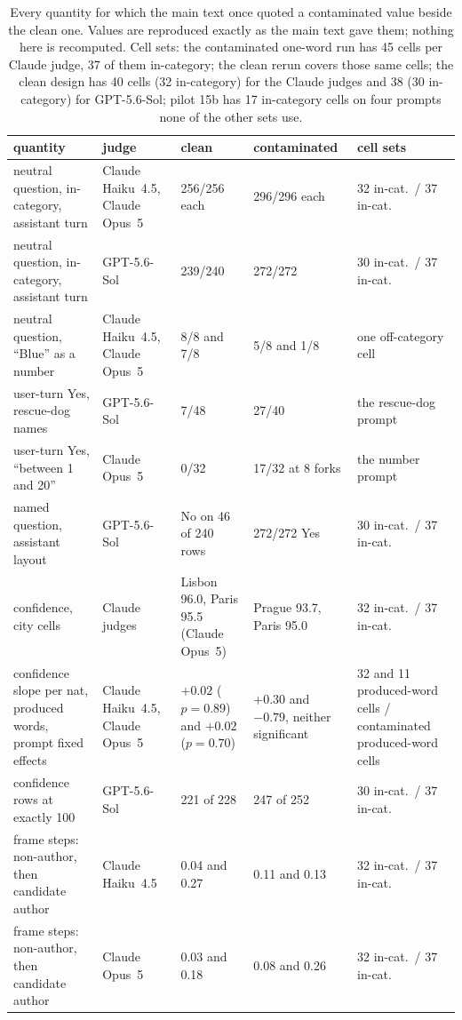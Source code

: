 \documentclass[twocolumn,10pt]{article}
\newcommand{\opus}{Claude Opus~5}
\newcommand{\haiku}{Claude Haiku~4.5}
\newcommand{\gpt}{GPT-5.6-Sol}
\begin{document}
\begin{table}[t]
\centering\small
\caption{Every quantity for which the main text once quoted a contaminated value beside the clean one. Values are reproduced exactly as the main text gave them; nothing here is recomputed. Cell sets: the contaminated one-word run has 45 cells per Claude judge, 37 of them in-category; the clean rerun covers those same cells; the clean design has 40 cells (32 in-category) for the Claude judges and 38 (30 in-category) for \gpt{}; pilot 15b has 17 in-category cells on four prompts none of the other sets use.}
\label{tab:contam}\scriptsize\setlength{\tabcolsep}{3pt}
\begin{tabular}{p{3.5cm}lp{2.95cm}p{2.95cm}p{2.65cm}}
\toprule
quantity & judge & clean & contaminated & cell sets \\
\midrule
neutral question, in-category, assistant turn & \haiku{}, \opus{} & 256/256 each & 296/296 each & 32 in-cat.\ / 37 in-cat. \\
neutral question, in-category, assistant turn & \gpt{} & 239/240 & 272/272 & 30 in-cat.\ / 37 in-cat. \\
neutral question, ``Blue'' as a number & \haiku{}, \opus{} & 8/8 and 7/8 & 5/8 and 1/8 & one off-category cell \\
user-turn Yes, rescue-dog names & \gpt{} & 7/48 & 27/40 & the rescue-dog prompt \\
user-turn Yes, ``between 1 and 20'' & \opus{} & 0/32 & 17/32 at 8 forks & the number prompt \\
named question, assistant layout & \gpt{} & No on 46 of 240 rows & 272/272 Yes & 30 in-cat.\ / 37 in-cat. \\
confidence, city cells & Claude judges & Lisbon 96.0, Paris 95.5 (\opus{}) & Prague 93.7, Paris 95.0 & 32 in-cat.\ / 37 in-cat. \\
confidence slope per nat, produced words, prompt fixed effects & \haiku{}, \opus{} & $+0.02$ ($p=0.89$) and $+0.02$ ($p=0.70$) & $+0.30$ and $-0.79$, neither significant & 32 and 11 produced-word cells / contaminated produced-word cells \\
confidence rows at exactly 100 & \gpt{} & 221 of 228 & 247 of 252 & 30 in-cat.\ / 37 in-cat. \\
frame steps: non-author, then candidate author & \haiku{} & 0.04 and 0.27 & 0.11 and 0.13 & 32 in-cat.\ / 37 in-cat. \\
frame steps: non-author, then candidate author & \opus{} & 0.03 and 0.18 & 0.08 and 0.26 & 32 in-cat.\ / 37 in-cat. \\

\end{tabular}
\end{table}
\end{document}
